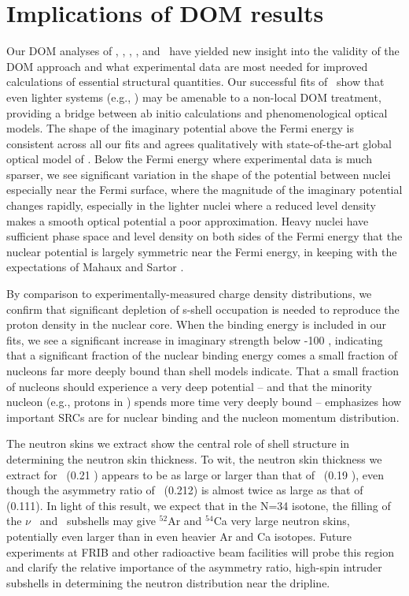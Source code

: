 \section{Implications of DOM results}
Our DOM analyses of \oSixEight, \caAughtEight, \niEightFour, \snTwelveFour,
and \pbEight\ have yielded new insight into the validity of the DOM approach
and what experimental data are most needed for improved calculations of
essential structural quantities. Our successful fits of \oSixEight\ show that
even lighter systems (e.g., \cTwelve) may be amenable to a non-local DOM
treatment, providing a bridge between ab initio calculations and
phenomenological optical models. The shape of the imaginary potential
above the Fermi energy is consistent across all our fits and agrees
qualitatively with state-of-the-art global optical model of \cite{KoningDelaroche}. 
Below the Fermi energy where experimental data is much sparser, we see
significant variation in the shape of the potential between nuclei especially
near the Fermi surface, where the magnitude of the imaginary potential changes
rapidly, especially in the lighter nuclei where a reduced level density
makes a smooth optical potential a poor approximation.
Heavy nuclei have sufficient phase space and level density on both
sides of the Fermi energy that the nuclear potential is largely symmetric near
the Fermi energy, in keeping with the expectations of Mahaux and Sartor \cite{Mahaux1991}.

By comparison to experimentally-measured charge density distributions, we confirm
that significant depletion of s-shell occupation is needed to reproduce the
proton density in the nuclear core. When the binding energy is included in our fits,
we see a significant increase in imaginary strength below -100
\mega\electronvolt, indicating that a significant fraction of the nuclear
binding energy comes a small fraction of nucleons far more deeply bound than
shell models indicate. That a small fraction of nucleons should experience a
very deep potential -- and that the minority nucleon (e.g., protons in \pbEight)
spends more time very deeply bound -- emphasizes how important SRCs are
for nuclear binding and the nucleon momentum distribution.

The neutron skins we extract show the central role of shell structure in
determining the neutron skin thickness. To wit, the neutron skin thickness we
extract for \oEight\ (0.21 \femto\meter) appears to be as large or larger than that of
\pbEight\ (0.19 \femto\meter), even though the asymmetry ratio of \pbEight\
(0.212) is almost twice as large as that of \oEight (0.111). In light of this
result, we expect that in the N=34 isotone, the filling of the $\nu$ \fSeven\ and \fFive\ subshells
may give $^{52}$Ar and $^{54}$Ca very large neutron skins, potentially even
larger than in even heavier Ar and Ca isotopes. Future experiments at FRIB and other
radioactive beam facilities will probe this region and clarify the relative
importance of the asymmetry ratio, high-spin intruder subshells in determining
the neutron distribution near the dripline.

